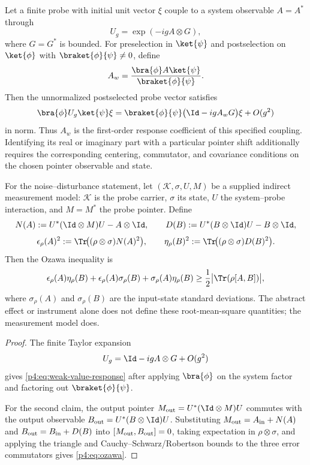 \documentclass[12pt,a4paper]{article}
\begin{document}
\begin{proposition}
\label{p4:prop:weak-value-ozawa-domain}
Let a finite probe with initial unit vector \(\xi\) couple to a system
observable \(A=A^*\) through
\[
U_g=\exp(-igA\otimes G),
\]
where \(G=G^*\) is bounded.  For preselection in \(\ket{\psi}\) and
postselection on \(\ket{\phi}\) with
\(\braket{\phi}{\psi}\ne0\), define
\begin{equation}
\label{p4:eq:weak-value}
A_w = \frac{\bra{\phi}A\ket{\psi}}{\braket{\phi}{\psi}}.
\end{equation}
Then the unnormalized postselected probe vector satisfies
\begin{equation}
\label{p4:eq:weak-value-response}
\bra{\phi}U_g\ket{\psi}\xi
=
\braket{\phi}{\psi}
\bigl(\Id-igA_wG\bigr)\xi+O(g^2)
\end{equation}
in norm.  Thus \(A_w\) is the first-order response coefficient of this
specified coupling.  Identifying its real or imaginary part with a particular
pointer shift additionally requires the corresponding centering, commutator,
and covariance conditions on the chosen pointer observable and state.

For the noise--disturbance statement, let
\((\mathcal K,\sigma,U,M)\) be a supplied indirect measurement model:
\(\mathcal K\) is the probe carrier, \(\sigma\) its state, \(U\) the
system--probe interaction, and \(M=M^*\) the probe pointer.  Define
\[
N(A):=U^*(\Id\otimes M)U-A\otimes\Id,
\qquad
D(B):=U^*(B\otimes\Id)U-B\otimes\Id,
\]
\[
\epsilon_\rho(A)^2
:=\Tr\!\bigl((\rho\otimes\sigma)N(A)^2\bigr),
\qquad
\eta_\rho(B)^2
:=\Tr\!\bigl((\rho\otimes\sigma)D(B)^2\bigr).
\]
Then the Ozawa inequality \cite{Ozawa2003} is
\begin{equation}
\label{p4:eq:ozawa}
\epsilon_\rho(A)\eta_\rho(B)
+ \epsilon_\rho(A)\sigma_\rho(B)
+ \sigma_\rho(A)\eta_\rho(B)
\ge \frac12\bigl|\Tr(\rho[A,B])\bigr|,
\end{equation}
where \(\sigma_\rho(A)\) and \(\sigma_\rho(B)\) are the input-state standard
deviations.  The abstract effect or instrument alone does not define these
root-mean-square quantities; the measurement model does.
\end{proposition}

\begin{proof}
The finite Taylor expansion
\[
U_g=\Id-igA\otimes G+O(g^2)
\]
gives \eqref{p4:eq:weak-value-response} after applying
\(\bra{\phi}\) on the system factor and factoring out
\(\braket{\phi}{\psi}\).

For the second claim, the output pointer
\(M_{\rm out}=U^*(\Id\otimes M)U\) commutes with the output observable
\(B_{\rm out}=U^*(B\otimes\Id)U\).  Substituting
\(M_{\rm out}=A_{\rm in}+N(A)\) and
\(B_{\rm out}=B_{\rm in}+D(B)\) into
\([M_{\rm out},B_{\rm out}]=0\), taking expectation in
\(\rho\otimes\sigma\), and applying the triangle and
Cauchy--Schwarz/Robertson bounds to the three error commutators gives
\eqref{p4:eq:ozawa}.
\end{proof}
\end{document}
